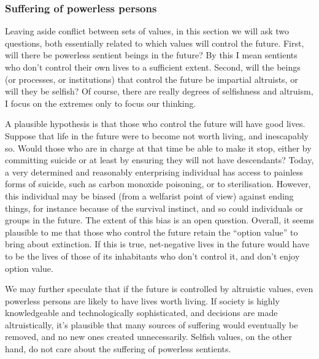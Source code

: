 \documentclass[british]{article}
\begin{document}
\subsubsection{Suffering of powerless persons}\label{powerless}
Leaving aside conflict between sets of values, in this section we will ask two questions, both essentially related to which values will control the future. First, will there be powerless sentient beings in the future? By this I mean sentients who don't control their own lives to a sufficient extent. Second, will the beings (or processes, or institutions) that control the future be impartial altruists, or will they be selfish? Of course, there are really degrees of selfishness and altruism, I focus on the extremes only to focus our thinking.

A plausible hypothesis is that those who control the future will have good lives. Suppose that life in the future were to become not worth living, and inescapably so. Would those who are in charge at that time be able to make it stop, either by committing suicide or at least by ensuring they will not have descendants? Today, a very determined and reasonably enterprising individual has access to painless forms of suicide, such as carbon monoxide poisoning, or to sterilisation. However, this individual may be biased (from a welfarist point of view) against ending things, for instance because of the survival instinct, and so could individuals or groups in the future. The extent of this bias is an open question. Overall, it seems plausible to me that those who control the future retain the ``option value'' to bring about extinction. If this is true, net-negative lives in the future would have to be the lives of those of its inhabitants who don't control it, and don't enjoy option value.

We may further speculate that if the future is controlled by altruistic values, even powerless persons are likely to have lives worth living. If society is highly knowledgeable and technologically sophisticated, and decisions are made altruistically, it's plausible that many sources of suffering would eventually be removed, and no new ones created unnecessarily. Selfish values, on the other hand, do not care about the suffering of powerless sentients. 
\end{document}
